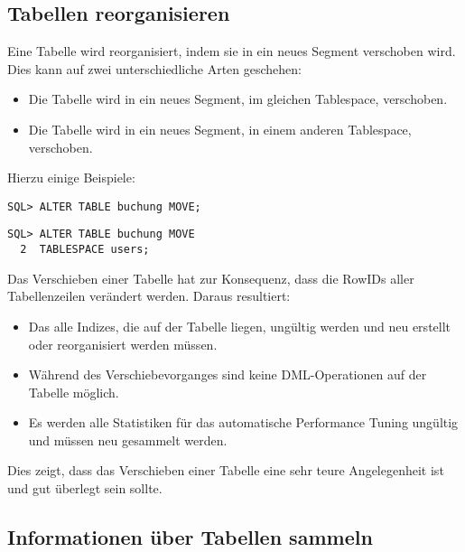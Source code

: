       \subsection{Tabellen reorganisieren}
        Eine Tabelle wird reorganisiert, indem sie in ein neues Segment verschoben wird. Dies kann auf zwei unterschiedliche Arten geschehen:
        \begin{itemize}
          \item Die Tabelle wird in ein neues Segment, im gleichen Tablespace, verschoben.
          \item Die Tabelle wird in ein neues Segment, in einem anderen Tablespace, verschoben.
        \end{itemize}
\clearpage		
        Hierzu einige Beispiele:
        \begin{lstlisting}[caption={Reorganisieren der Tabelle \identifier{Buchung}},label=admin310,language=oracle_sql]
SQL> ALTER TABLE buchung MOVE;
        \end{lstlisting}
        \begin{lstlisting}[caption={Verschieben einer Tabelle in einen anderen Tablespace},label=admin311,language=oracle_sql]
SQL> ALTER TABLE buchung MOVE
  2  TABLESPACE users;
        \end{lstlisting}
        Das Verschieben einer Tabelle hat zur Konsequenz, dass die RowIDs aller Tabellenzeilen verändert werden. Daraus resultiert:
        \begin{itemize}
          \item Das alle Indizes, die auf der Tabelle liegen, ungültig werden und neu erstellt oder reorganisiert werden müssen.
          \item Während des Verschiebevorganges sind keine DML-Operationen auf der Tabelle mög\-lich.
          \item Es werden alle Statistiken für das automatische Performance Tuning ungültig und müssen neu gesammelt werden.
        \end{itemize}
        Dies zeigt, dass das Verschieben einer Tabelle eine sehr teure Angelegenheit ist und gut überlegt sein sollte.
      \subsection{Informationen über Tabellen sammeln}
        \begin{literaturinternet}
          \item \cite{ADMIN015}
        \end{literaturinternet}
